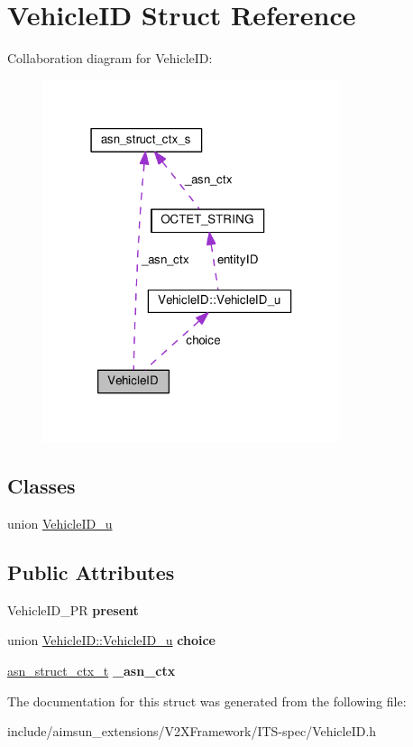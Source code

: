 \hypertarget{structVehicleID}{}\section{Vehicle\+ID Struct Reference}
\label{structVehicleID}


Collaboration diagram for Vehicle\+ID\+:\nopagebreak
\begin{figure}[H]
\begin{center}
\leavevmode
\includegraphics[width=247pt]{structVehicleID__coll__graph}
\end{center}
\end{figure}
\subsection*{Classes}
\begin{DoxyCompactItemize}
\item 
union \hyperlink{unionVehicleID_1_1VehicleID__u}{Vehicle\+I\+D\+\_\+u}
\end{DoxyCompactItemize}
\subsection*{Public Attributes}
\begin{DoxyCompactItemize}
\item 
Vehicle\+I\+D\+\_\+\+PR {\bfseries present}\hypertarget{structVehicleID_a8387612dbb67c9033bce6a3ee32ca69f}{}\label{structVehicleID_a8387612dbb67c9033bce6a3ee32ca69f}

\item 
union \hyperlink{unionVehicleID_1_1VehicleID__u}{Vehicle\+I\+D\+::\+Vehicle\+I\+D\+\_\+u} {\bfseries choice}\hypertarget{structVehicleID_a3f26947b7576f0c59ee46e2d67ee050d}{}\label{structVehicleID_a3f26947b7576f0c59ee46e2d67ee050d}

\item 
\hyperlink{structasn__struct__ctx__s}{asn\+\_\+struct\+\_\+ctx\+\_\+t} {\bfseries \+\_\+asn\+\_\+ctx}\hypertarget{structVehicleID_aacade248ee47e1e14e7d2d517e1872b5}{}\label{structVehicleID_aacade248ee47e1e14e7d2d517e1872b5}

\end{DoxyCompactItemize}


The documentation for this struct was generated from the following file\+:\begin{DoxyCompactItemize}
\item 
include/aimsun\+\_\+extensions/\+V2\+X\+Framework/\+I\+T\+S-\/spec/Vehicle\+I\+D.\+h\end{DoxyCompactItemize}

